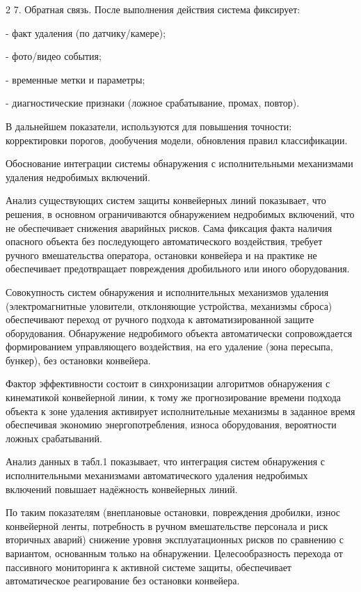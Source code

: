 \begin{multicols}{2}
7. Обратная связь. После выполнения действия система фиксирует:

- факт удаления (по датчику/камере);

- фото/видео события;

- временные метки и параметры;

- диагностические признаки (ложное срабатывание, промах, повтор).

В дальнейшем показатели, используются для повышения точности:
корректировки порогов, дообучения модели, обновления правил
классификации.

Обоснование интеграции системы обнаружения с исполнительными
механизмами удаления недробимых включений.

Анализ существующих систем защиты конвейерных линий показывает, что
решения, в основном ограничиваются обнаружением недробимых включений,
что не обеспечивает снижения аварийных рисков. Сама фиксация факта
наличия опасного объекта без последующего автоматического воздействия,
требует ручного вмешательства оператора, остановки конвейера и на
практике не обеспечивает предотвращает повреждения дробильного или иного
оборудования.

Совокупность систем обнаружения и исполнительных механизмов удаления
(электромагнитные уловители, отклоняющие устройства, механизмы сброса)
обеспечивают переход от ручного подхода к автоматизированной защите
оборудования. Обнаружение недробимого объекта автоматически
сопровождается формированием управляющего воздействия, на его удаление
(зона пересыпа, бункер), без остановки конвейера.

Фактор эффективности состоит в синхронизации алгоритмов обнаружения с
кинематикой конвейерной линии, к тому же прогнозирование времени подхода
объекта к зоне удаления активирует исполнительные механизмы в заданное
время обеспечивая экономию энергопотребления, износа оборудования,
вероятности ложных срабатываний.

Анализ данных в табл.1 показывает, что интеграция систем обнаружения с
исполнительными механизмами автоматического удаления недробимых
включений повышает надёжность конвейерных линий.

По таким показателям (внеплановые остановки, повреждения дробилки, износ
конвейерной ленты, потребность в ручном вмешательстве персонала и риск
вторичных аварий) снижение уровня эксплуатационных рисков по сравнению с
вариантом, основанным только на обнаружении. Целесообразность перехода
от пассивного мониторинга к активной системе защиты, обеспечивает
автоматическое реагирование без остановки конвейера.
\end{multicols}


